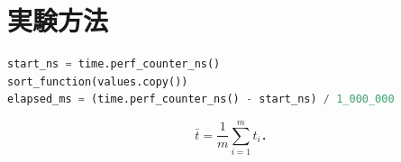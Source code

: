 \section{実験方法}



\begin{lstlisting}[language=Python,caption={実行時間を計測する処理の抜粋},label={lst:timer}]
start_ns = time.perf_counter_ns()
sort_function(values.copy())
elapsed_ms = (time.perf_counter_ns() - start_ns) / 1_000_000
\end{lstlisting}


\begin{equation}
  \bar{t}=\frac{1}{m}\sum_{i=1}^{m} t_i ．
  \label{eq:mean}
\end{equation}
